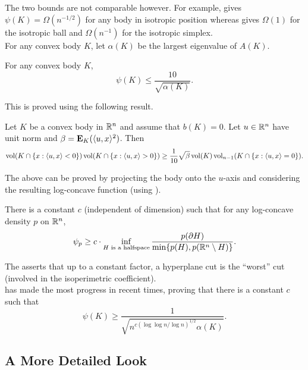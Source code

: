 The two bounds  are not comparable however. For example,  gives $\psi(K)=\Omega(n^{-1/2})$ for any body in isotropic position whereas  gives $\Omega(1)$ for the isotropic ball and $\Omega(n^{-1})$ for the isotropic simplex.\\

For any convex body $K$, let $\alpha(K)$ be the largest eigenvalue of $A(K)$. 

\begin{theorem}
	\label{kls conj hyperplane}
	For any convex body $K$,
	\[ \psi(K) \leq \frac{10}{\sqrt{\alpha(K)}}. \]
\end{theorem}

This is proved using the following result.

\begin{theorem}
	Let $K$ be a convex body in $\mathbb{R}^n$ and assume that $b(K)=0$. Let $u\in\mathbb{R}^n$ have unit norm and $\beta=\textbf{E}_K(\langle u,x\rangle^2)$. Then
	\[ \operatorname{vol}(K \cap \{x : \langle u,x\rangle < 0\}) \operatorname{vol}(K \cap \{x : \langle u,x\rangle > 0\}) \geq \frac{1}{10}\sqrt{\beta}\operatorname{vol}(K)\operatorname{vol}_{n-1}(K \cap \{x : \langle u,x\rangle = 0\}). \]
\end{theorem}

The above can be proved by projecting the body onto the $u$-axis and considering the resulting log-concave function (using ).

\begin{fcon}
	\label{con: kls conjecture}
	There is a constant $c$ (independent of dimension) such that for any log-concave density $p$ on $\mathbb{R}^n$,
	\[ \psi_p \geq c \cdot \inf_{H\text{ is a halfspace}} \frac{p(\partial H)}{\min\{p(H),p(\mathbb{R}^n\setminus H)\}}. \]
\end{fcon}

The  asserts that up to a constant factor, a hyperplane cut is the ``worst'' cut (involved in the isoperimetric coefficient).\\

\cite{chen2021constant} has made the most progress in recent times, proving that there is a constant $c$ such that
\[ \psi(K) \geq \frac{1}{\sqrt{ n^{c\left(\log\log n/\log n\right)^{1/2}} \alpha(K)}}. \]

\subsection{A More Detailed Look}

